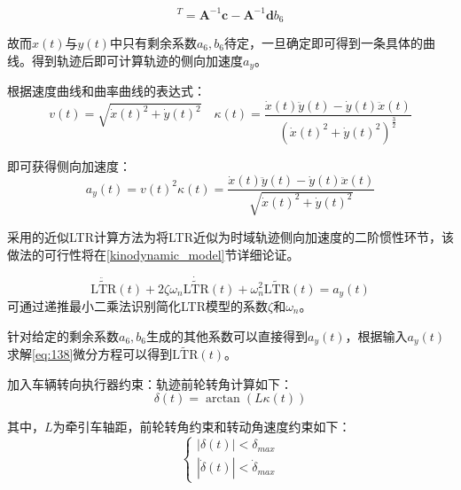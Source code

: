     \begin{equation}
    [b_3\ b_4\ b_5]^T = \boldsymbol{A}^{-1}\boldsymbol{c} - \boldsymbol{A}^{-1}\boldsymbol{d} b_6
    \label{eq:134}
    \end{equation}

    故而$x(t)$与$y(t)$中只有剩余系数$a_6,b_6$待定，一旦确定即可得到一条具体的曲线。得到轨迹后即可计算轨迹的侧向加速度$a_y$。

    根据速度曲线和曲率曲线的表达式：
    \begin{equation}
    v(t) = \sqrt{\dot{x}(t)^2 + \dot{y}(t)^2}
    \quad
    \kappa(t) = \frac{\dot{x}(t)\ddot{y}(t) - \dot{y}(t)\ddot{x}(t)}{\left( \dot{x}(t)^2 + \dot{y}(t)^2 \right)^{\frac{3}{2}}}
    \label{eq:136}
    \end{equation}

    即可获得侧向加速度：
    \begin{equation}
    a_y(t) = v(t)^2 \kappa(t) = \frac{\dot{x}(t)\ddot{y}(t) - \dot{y}(t)\ddot{x}(t)}{\sqrt{\dot{x}(t)^2 + \dot{y}(t)^2}}
    \label{eq:137}
    \end{equation}

    采用的近似LTR计算方法为将LTR近似为时域轨迹侧向加速度的二阶惯性环节，该做法的可行性将在\ref{kinodynamic_model}节详细论证。

    \begin{equation}
    \ddot{\tilde{\text{LTR}}}(t) + 2\zeta\omega_n \dot{\tilde{\text{LTR}}}(t) + \omega_n^2 \tilde{\text{LTR}}(t) = a_y(t)
    \label{eq:138}
    \end{equation}
    可通过递推最小二乘法识别简化LTR模型的系数$\zeta$和$\omega_n$。

    针对给定的剩余系数$a_6,b_6$生成的其他系数可以直接得到$a_y(t)$，根据输入$a_y(t)$求解\eqref{eq:138}微分方程可以得到$\tilde{\text{LTR}}(t)$。

    加入车辆转向执行器约束：轨迹前轮转角计算如下：
    \begin{equation}
    \delta(t) = \arctan\left( L \kappa(t) \right)
    \label{eq:139}
    \end{equation}

    \noindent 其中，$L$为牵引车轴距，前轮转角约束和转动角速度约束如下：
    \begin{equation}
    \begin{cases}
    |\delta(t)| < \delta_{max} \\
    |\dot{\delta}(t)| < \dot{\delta}_{max}
    \end{cases}
    \label{eq:140}
    \end{equation}

